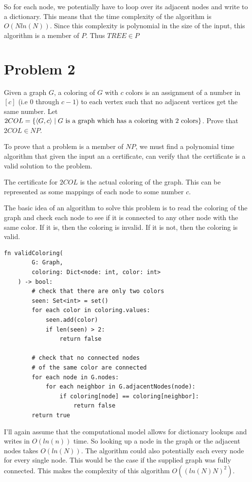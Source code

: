 \documentclass[12pt]{article}
\begin{document}
So for each node, we potentially have to loop over its adjacent nodes and write to a dictionary. This means that the time complexity of the algorithm is $O(Nln(N))$. Since this complexity is polynomial in the size of the input, this algorithm is a member of $P$. Thus $TREE \in P$

\section*{Problem 2}

\begin{questionbox}
	Given a graph $G$, a coloring of $G$ with $c$ colors is an assignment of a number in $[c]$ (i.e 0 through $c-1$) to each vertex such that no adjacent vertices get the same number. Let $2COL = \{ \braket{G, c} \mid G \text{ is a graph which has a coloring with 2 colors} \}$. Prove that $2COL \in NP$.
\end{questionbox}

To prove that a problem is a member of $NP$, we must find a polynomial time algorithm that given the input an a certificate, can verify that the certificate is a valid solution to the problem.

The certificate for $2COL$ is the actual coloring of the graph. This can be represented as some mappings of each node to some number $c$.

The basic idea of an algorithm to solve this problem is to read the coloring of the graph and check each node to see if it is connected to any other node with the same color. If it is, then the coloring is invalid. If it is not, then the coloring is valid.

\begin{lstlisting}[basicstyle=\small, tabsize=3]
	fn validColoring(
		G: Graph,
		coloring: Dict<node: int, color: int>
	) -> bool:
		# check that there are only two colors
		seen: Set<int> = set()
		for each color in coloring.values:
			seen.add(color)
			if len(seen) > 2:
				return false

		# check that no connected nodes
		# of the same color are connected
		for each node in G.nodes:
			for each neighbor in G.adjacentNodes(node):
				if coloring[node] == coloring[neighbor]:
					return false
		return true
\end{lstlisting}


I'll again assume that the computational model allows for dictionary lookups and writes in $O(ln(n))$ time. So looking up a node in the graph or the adjacent nodes takes $O(ln(N))$. The algorithm could also potentially each every node for every single node. This would be the case if the supplied graph was fully connected. This makes the complexity of this algorithm $O((ln(N)N)^2)$.
\end{document}
